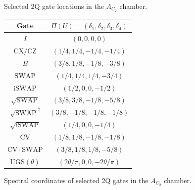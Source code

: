 \begin{figure}[!htbp]\centering
\makeatletter{}\makeatother
\setlength{\abovecaptionskip}{2pt}\setlength{\belowcaptionskip}{0pt}
\caption{Selected 2Q gate locations in the $A_{C_2}$ chamber.}\label{fig:4}
\end{figure}
\begin{figure}[!htbp]
\begingroup
\makeatletter{}\makeatother
\centering
\caption{Spectral coordinates of selected 2Q gates in the $A_{C_2}$ chamber.}\label{tab:spectral}
\begingroup\small
\setlength{\tabcolsep}{7pt}\renewcommand{\arraystretch}{1.05}
\begin{tabular}{cc}
\toprule
Gate & $\Pi(U)=(\delta_1,\delta_2,\delta_3,\delta_4)$\\
\midrule
$I$ & $(0,0,0,0)$ \\
$\mathrm{CX/CZ}$ & $(1/4,1/4,-1/4,-1/4)$ \\
$B$ & $(3/8,1/8,-1/8,-3/8)$ \\
$\mathrm{SWAP}$ & $(1/4,1/4,1/4,-3/4)$ \\
$\mathrm{iSWAP}$ & $(1/2,0,0,-1/2)$ \\
$\sqrt{\mathrm{SWAP}}$ & $(3/8,3/8,-1/8,-5/8)$ \\
$\sqrt{\mathrm{SWAP}}^{\dagger}$ & $(3/8,-1/8,-1/8,-1/8)$ \\
$\sqrt{\mathrm{iSWAP}}$ & $(1/4,0,0,-1/4)$ \\
$\mathrm{CV}$ & $(1/8,1/8,-1/8,-1/8)$ \\
$\mathrm{CV}\!\cdot\!\mathrm{SWAP}$ & $(3/8,1/8,1/8,-5/8)$ \\
$\mathrm{UGS}(\theta)$ & $(2\theta/\pi,0,0,-2\theta/\pi)$ \\
\bottomrule
\end{tabular}\par
\endgroup
\endgroup
\end{figure}
